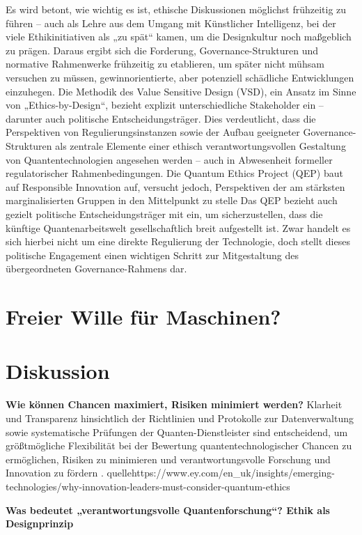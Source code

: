     Es wird betont, wie wichtig es ist, ethische Diskussionen möglichst frühzeitig zu führen – auch als Lehre aus dem Umgang mit Künstlicher Intelligenz, bei der viele Ethikinitiativen als „zu spät“ kamen, um die Designkultur noch maßgeblich zu prägen. Daraus ergibt sich die Forderung, Governance-Strukturen und normative Rahmenwerke frühzeitig zu etablieren, um später nicht mühsam versuchen zu müssen, gewinnorientierte, aber potenziell schädliche Entwicklungen einzuhegen.\cite{1-s2.0-S0370157324001078}
    Die Methodik des Value Sensitive Design (VSD), ein Ansatz im Sinne von „Ethics-by-Design“, bezieht explizit unterschiedliche Stakeholder ein – darunter auch politische Entscheidungsträger. Dies verdeutlicht, dass die Perspektiven von Regulierungsinstanzen sowie der Aufbau geeigneter Governance-Strukturen als zentrale Elemente einer ethisch verantwortungsvollen Gestaltung von Quantentechnologien angesehen werden – auch in Abwesenheit formeller regulatorischer Rahmenbedingungen. \cite{umbrello_quantum_2024}
    Die Quantum Ethics Project (QEP) baut auf Responsible Innovation auf, versucht jedoch, Perspektiven der am stärksten marginalisierten Gruppen in den Mittelpunkt zu stelle \cite{1-s2.0-S0370157324001078}
    Das QEP bezieht auch gezielt politische Entscheidungsträger mit ein, um sicherzustellen, dass die künftige Quantenarbeitswelt gesellschaftlich breit aufgestellt ist. Zwar handelt es sich hierbei nicht um eine direkte Regulierung der Technologie, doch stellt dieses politische Engagement einen wichtigen Schritt zur Mitgestaltung des übergeordneten Governance-Rahmens dar. \cite{1-s2.0-S0370157324001078}


\section{Freier Wille für Maschinen?}



\section{Diskussion}

\textbf{Wie können Chancen maximiert, Risiken minimiert werden?}
Klarheit und Transparenz hinsichtlich der Richtlinien und Protokolle zur Datenverwaltung sowie systematische Prüfungen der Quanten-Dienstleister sind entscheidend, um größtmögliche Flexibilität bei der Bewertung quantentechnologischer Chancen zu ermöglichen, Risiken zu minimieren und verantwortungsvolle Forschung und Innovation zu fördern .
quelle{https://www.ey.com/en_uk/insights/emerging-technologies/why-innovation-leaders-must-consider-quantum-ethics}


\textbf{Was bedeutet „verantwortungsvolle Quantenforschung“?
Ethik als Designprinzip}

\printbibliography
